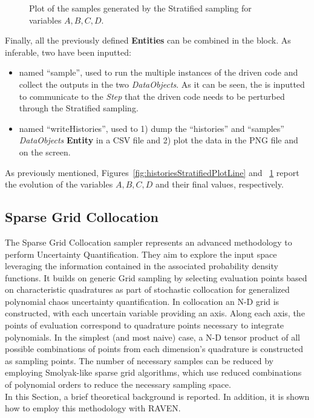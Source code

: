 \begin{enumerate}
\begin{figure}[h!]
  \caption{Plot of the samples generated by the Stratified sampling for variables $A,B,C,D$.}
  \label{fig:samplesStratifiedPlotLine}
 \end{figure}
   Finally, all the previously defined \textbf{Entities} can be combined in
   the  block. As inferable,
   two  have been inputted:
   \begin{itemize}
     \item {} named ``sample'', used to run the multiple
     instances of the driven code and
     collect the outputs in the two \textit{DataObjects}. As it can be
     seen, the  is inputted to communicate to the
     \textit{Step} that the driven code needs to
     be perturbed through the Stratified sampling.
     \item  {} named ``writeHistories'', used to 1) dump
     the ``histories'' and ``samples'' \textit{DataObjects}
     \textbf{Entity} in a CSV file and 2) plot the data in the PNG file and
     on the screen.
   \end{itemize}
\end{enumerate}
 As previously mentioned, Figures~\ref{fig:historiesStratifiedPlotLine} and ~\ref{fig:samplesStratifiedPlotLine}  report the evolution of the
 variables $A,B,C,D$ and their final values, respectively.


\subsection{Sparse Grid Collocation}
\label{sub:SGC}
The Sparse Grid Collocation sampler represents an advanced methodology to perform Uncertainty Quantification. They aim
to explore the input space leveraging the information contained in the associated probability density functions. It builds on generic Grid sampling by selecting evaluation points based on characteristic quadratures as part of stochastic collocation for generalized polynomial chaos uncertainty quantification. In collocation an N-D grid is constructed, with each uncertain variable providing an axis. Along each axis, the points of evaluation correspond to quadrature points necessary to integrate polynomials. In the simplest (and most naive) case, a N-D tensor product of all possible combinations of points from each dimension’s quadrature is constructed as sampling points. The number of necessary samples can be reduced by employing Smolyak-like sparse grid algorithms, which use reduced combinations of polynomial orders to reduce the necessary sampling space.
\\In this Section, a brief theoretical
background is reported. In addition, it is shown how to employ this methodology with RAVEN.
